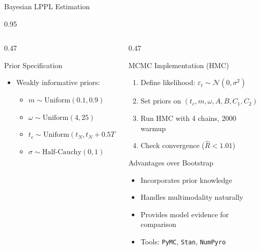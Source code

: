 \documentclass[9pt, aspectratio=169, t]{beamer}
\begin{document}
\begin{frame}{Bayesian LPPL Estimation}
\begin{cminipage}{0.95\textwidth}
{\begin{columns}[T]
\begin{column}{0.47\textwidth}
            \begin{exampleblock}{Prior Specification}
                \begin{itemize}\setlength{\itemsep}{0pt}
                    \item Weakly informative priors:
                    \begin{itemize}\setlength{\itemsep}{0pt}
                        \item $m \sim \text{Uniform}(0.1, 0.9)$
                        \item $\omega \sim \text{Uniform}(4, 25)$
                        \item $t_c \sim \text{Uniform}(t_N, t_N + 0.5T)$
                        \item $\sigma \sim \text{Half-Cauchy}(0, 1)$
                    \end{itemize}
                \end{itemize}
            \end{exampleblock}
        \end{column}
        \begin{column}{0.47\textwidth}
            \begin{alertblock}{MCMC Implementation (HMC)}
                \begin{enumerate}\setlength{\itemsep}{0pt}
                    \item Define likelihood: $\varepsilon_t \sim \mathcal{N}(0, \sigma^2)$
                    \item Set priors on $(t_c, m, \omega, A, B, C_1, C_2)$
                    \item Run HMC with 4 chains, 2000 warmup
                    \item Check convergence ($\hat{R} < 1.01$)
                \end{enumerate}
            \end{alertblock}

            \begin{block}{Advantages over Bootstrap}
                \begin{itemize}\setlength{\itemsep}{0pt}
                    \item Incorporates prior knowledge
                    \item Handles multimodality naturally
                    \item Provides model evidence for comparison
                    \item Tools: \texttt{PyMC}, \texttt{Stan}, \texttt{NumPyro}
                \end{itemize}
            \end{block}
        \end{column}
    \end{columns}
    }
    \end{cminipage}
\end{frame}
\end{document}
